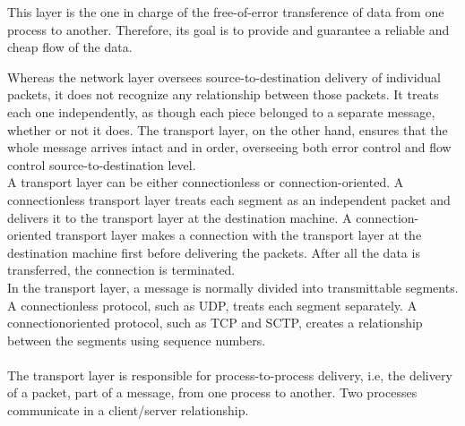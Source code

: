 %
%
%
%
%



This layer is the one in charge of the free-of-error transference of data from one process to another. Therefore, its goal is to provide and guarantee a reliable and cheap flow of the data. 

Whereas the network layer oversees source-to-destination delivery of individual packets, it does not recognize any relationship between those packets. It treats each one independently, as though each piece belonged to a separate message, whether or not it does. The transport layer, on the other hand, ensures that the whole message arrives intact and in order, overseeing both error control and flow control source-to-destination level. \\
A transport layer can be either connectionless or connection-oriented. A connectionless transport layer treats each segment as an independent packet and delivers it to the transport layer at the destination machine. A connection-oriented transport layer makes a connection with the transport layer at the destination machine first before delivering the packets. After all the data is transferred, the connection is terminated.\\
In the transport layer, a message is normally divided into transmittable segments. A connectionless protocol, such as UDP, treats each segment separately. A connectionoriented protocol, such as TCP and SCTP, creates a relationship between the segments using sequence numbers.
\paragraph{}
The transport layer is responsible for process-to-process delivery, i.e, the delivery of a packet, part of a message, from one process to another. Two processes communicate in a client/server relationship. 

